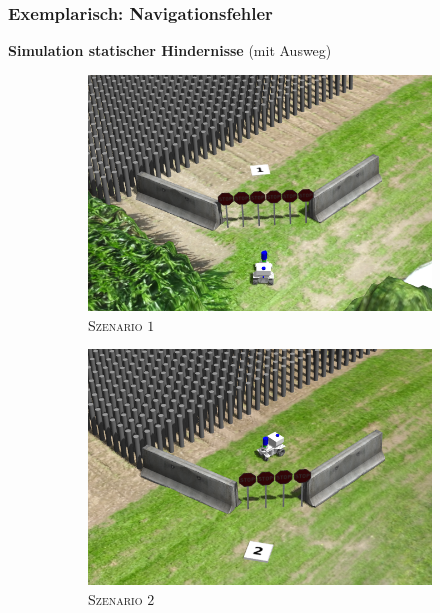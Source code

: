 \documentclass{beamer}
\begin{document}
\begin{frame}
  \frametitle{Exemplarisch: Navigationsfehler}
  \textbf{Simulation statischer Hindernisse} (mit Ausweg)
  \begin{figure}[H]
    \centering
    \begin{subfigure}[b]{0.24\textwidth}
        \centering
        \includegraphics[width=\textwidth]{img/static_1.png}
        \caption{\textsc{Szenario $1$}}
        \label{fig:static_1}
    \end{subfigure}
    \hfill
    \begin{subfigure}[b]{0.24\textwidth}
        \centering
        \includegraphics[width=\textwidth]{img/static_2.png}
        \caption{\textsc{Szenario $2$}}
        \label{fig:static_2}
    \end{subfigure}
    \begin{subfigure}[b]{0.24\textwidth}

\end{subfigure}
\end{figure}
\end{frame}
\end{document}
